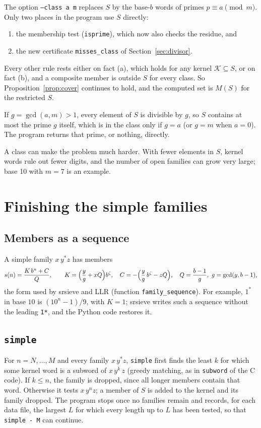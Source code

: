 \documentclass[11pt]{article}
\theoremstyle{definition}
\theoremstyle{remark}
\newcommand{\K}{\mathcal{K}}
\newcommand{\code}[1]{\texttt{#1}}
\begin{document}
The option \code{--class a m} replaces $S$ by the base-$b$ words of primes $p\equiv a\pmod m$. Only two places in the program use $S$ directly:
\begin{enumerate}[label=(\roman*)]
\item the membership test (\code{isprime}), which now also checks the residue, and
\item the new certificate \code{misses\_class} of Section~\ref{sec:divisor}.
\end{enumerate}
Every other rule rests either on fact (a), which holds for any kernel $\K\subseteq S$, or on fact (b), and a composite member is outside $S$ for every class. So Proposition~\ref{prop:cover} continues to hold, and the computed set is $M(S)$ for the restricted $S$.

If $g=\gcd(a,m)>1$, every element of $S$ is divisible by $g$, so $S$ contains at most the prime $g$ itself, which is in the class only if $g=a$ (or $g=m$ when $a=0$). The program returns that prime, or nothing, directly.

A class can make the problem much harder. With fewer elements in $S$, kernel words rule out fewer digits, and the number of open families can grow very large; base 10 with $m=7$ is an example.

\section{Finishing the simple families}

\subsection{Members as a sequence}
A simple family $x\,y^*z$ has members
\[
  s(n)=\frac{K\,b^n+C}{Q},\qquad
  K=\Bigl(\frac{y}{g}+xQ\Bigr)b^{\zeta},\quad
  C=-\Bigl(\frac{y}{g}\,b^{\zeta}-zQ\Bigr),\quad
  Q=\frac{b-1}{g},\ g=\gcd(y,b-1),
\]
the form used by srsieve and LLR (function \code{family\_sequence}). For example, $1^*$ in base $10$ is $(10^n-1)/9$, with $K=1$; srsieve writes such a sequence without the leading \code{1*}, and the Python code restores it.

\subsection{\code{simple}}
For $n=N,\dots,M$ and every family $x\,y^*z$, \code{simple} first finds the least $k$ for which some kernel word is a subword of $x\,y^k\,z$ (greedy matching, as in \code{subword} of the C code). If $k\le n$, the family is dropped, since all longer members contain that word. Otherwise it tests $x\,y^n z$; a member of $S$ is added to the kernel and its family dropped. The program stops once no families remain and records, for each data file, the largest $L$ for which every length up to $L$ has been tested, so that \code{simple - M} can continue.
\end{document}
